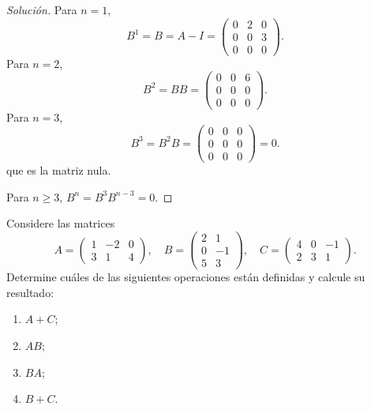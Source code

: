 \documentclass[a4,11pt]{aleph-notas}
\begin{document}
\begin{proof}[Solución]\hspace{0pt}
Para $n=1$,
    \[
        B^{1}=B=A-I= \begin{pmatrix}
            0 & 2 & 0 \\
            0 & 0 & 3 \\
            0 & 0 & 0
        \end{pmatrix}.
    \]
Para $n=2$, 
    \[
        B^{2}=B  B = \begin{pmatrix}
            0 & 0 & 6 \\
            0 & 0 & 0 \\
            0 & 0 & 0 
        \end{pmatrix}.
    \]
Para $n=3$, 
    \[
        B^{3}=B^{2} B= \begin{pmatrix}
            0 & 0 & 0 \\
            0 & 0 & 0 \\
            0 & 0 & 0
        \end{pmatrix} 
        = 0.
    \]
que es la matriz nula.

Para $n\geq 3$, $B^{n}=B^{3} B^{n-3}=0$.
\end{proof}

\begin{ejer}
    Considere las matrices
    \[
        A=\begin{pmatrix}1&-2&0\\3&1&4\end{pmatrix},\quad
        B=\begin{pmatrix}2&1\\0&-1\\5&3\end{pmatrix},\quad
        C=\begin{pmatrix}4&0&-1\\2&3&1\end{pmatrix}.
    \]
    Determine cu\'ales de las siguientes operaciones est\'an definidas y calcule su resultado:
    \begin{enumerate}
        \item $A+C$;
        \item $AB$;
        \item $BA$;
        \item $B+C$.
    \end{enumerate}
\end{ejer}
\end{document}
